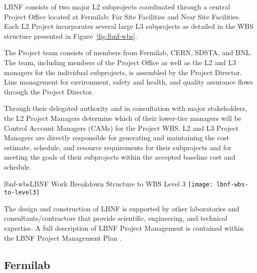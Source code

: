 LBNF consists of two major L2 subprojects coordinated through a central Project Office located at Fermilab: Far Site Facilities and Near Site Facilities. Each L2 Project incorporates several large L3 subprojects as detailed in the WBS structure presented in Figure~\ref{fig:lbnf-wbs}.

The Project team consists of members from Fermilab, CERN, SDSTA, and BNL.  The team, including members of the Project Office as well as the L2 and L3 managers for the individual subprojects, is assembled by the Project Director. 
Line management for environment, safety and health, and quality assurance flows through the Project Director. 


Through their delegated authority and in consultation with major stakeholders, the L2 Project Managers determine which of their lower-tier managers will be Control Account Managers (CAMs) for the Project WBS. L2 and L3 Project Managers are directly responsible for generating and maintaining the cost estimate, schedule, and resource requirements for their subprojects and for meeting the goals of their subprojects within the accepted baseline cost and schedule. 

\begin{cdrfigure}{lbnf-wbs}{LBNF Work Breakdown Structure to WBS Level 3}
  \texttt{[image: lbnf-wbs-to-level3]}
\end{cdrfigure}

The design and construction of LBNF is supported by other laboratories and consultants/contractors that provide scientific, engineering, and technical expertise. A full description of LBNF Project Management is contained within the LBNF Project Management Plan \fixme{[ref]}.

\subsection{Fermilab}  %


